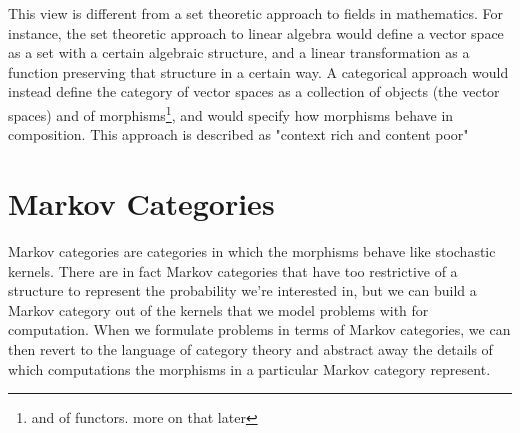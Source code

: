 This view is different from a set theoretic approach to fields in mathematics.
For instance, the set theoretic approach to linear algebra would define a vector space as a set with a certain algebraic structure, and a linear transformation as a function preserving that structure in a certain way.
A categorical approach would instead define the category of vector spaces as a collection of objects (the vector spaces) and of morphisms\footnote{and of functors. more on that later}, and would specify how morphisms behave in composition.
This approach is described as "context rich and content poor"



\section{Markov Categories}

Markov categories are categories in which the morphisms behave like stochastic kernels.
There are in fact Markov categories that have too restrictive of a structure to represent the probability we're interested in, but we can build a Markov category out of the kernels that we model problems with for computation.
When we formulate problems in terms of Markov categories, we can then revert to the language of category theory and abstract away the details of which computations the morphisms in a particular Markov category represent.

